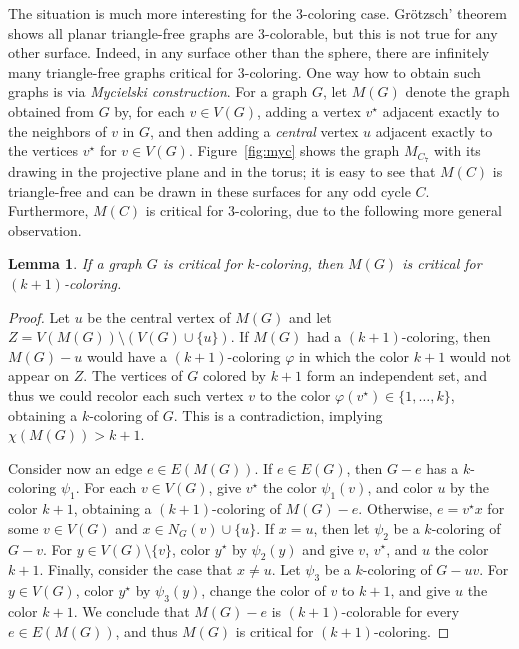 \documentclass[12pt,twoside,openright,a4paper]{book}
\newtheorem{lemma}[theorem]{Lemma}
\begin{document}
The situation is much more interesting for the 3-coloring case.  Gr\"{o}tzsch' theorem shows all planar triangle-free
graphs are 3-colorable, but this is not true for any other surface.  Indeed, in any surface other than the sphere,
there are infinitely many triangle-free graphs critical for $3$-coloring.  
One way how to obtain such graphs is via \emph{Mycielski construction}.
For a graph $G$, let $M(G)$ denote the graph obtained from $G$ by, for each $v\in V(G)$, adding a vertex $v^\star$
adjacent exactly to the neighbors of $v$ in $G$, and then adding a \emph{central} vertex $u$ adjacent exactly to the vertices $v^\star$ for $v\in V(G)$.
Figure~\ref{fig:myc} shows the graph $M_{C_7}$ with its drawing in the projective plane and in the torus;
it is easy to see that $M(C)$ is triangle-free and can be drawn in these surfaces for any odd cycle $C$.
Furthermore, $M(C)$ is critical for $3$-coloring, due to the following more general observation.
\begin{lemma}\label{lemma:myccrit}
If a graph $G$ is critical for $k$-coloring, then $M(G)$ is critical for $(k+1)$-coloring.
\end{lemma}
\begin{proof}
Let $u$ be the central vertex of $M(G)$ and let $Z=V(M(G))\setminus (V(G)\cup \{u\})$.
If $M(G)$ had a $(k+1)$-coloring, then $M(G)-u$ would have a $(k+1)$-coloring $\varphi$ in which
the color $k+1$ would not appear on $Z$.  The vertices of $G$ colored by $k+1$ form an independent
set, and thus we could recolor each such vertex $v$ to the color $\varphi(v^\star)\in\{1,\ldots,k\}$,
obtaining a $k$-coloring of $G$.  This is a contradiction, implying $\chi(M(G))>k+1$.

Consider now an edge $e\in E(M(G))$.  If $e\in E(G)$, then $G-e$ has a $k$-coloring $\psi_1$.
For each $v\in V(G)$, give $v^\star$ the color $\psi_1(v)$, and color $u$ by the color $k+1$,
obtaining a $(k+1)$-coloring of $M(G)-e$.  Otherwise, $e=v^\star x$ for some $v\in V(G)$
and $x\in N_G(v)\cup\{u\}$.  If $x=u$, then let $\psi_2$ be a $k$-coloring of $G-v$.
For $y\in V(G)\setminus \{v\}$, color $y^\star$ by $\psi_2(y)$ and give $v$, $v^\star$, and $u$ the color $k+1$.
Finally, consider the case that $x\neq u$.  Let $\psi_3$ be a $k$-coloring of $G-uv$.
For $y\in V(G)$, color $y^\star$ by $\psi_3(y)$, change the color of $v$ to $k+1$, and give $u$ the color $k+1$.
We conclude that $M(G)-e$ is $(k+1)$-colorable for every $e\in E(M(G))$, and thus $M(G)$ is critical for $(k+1)$-coloring.
\end{proof}
\end{document}
